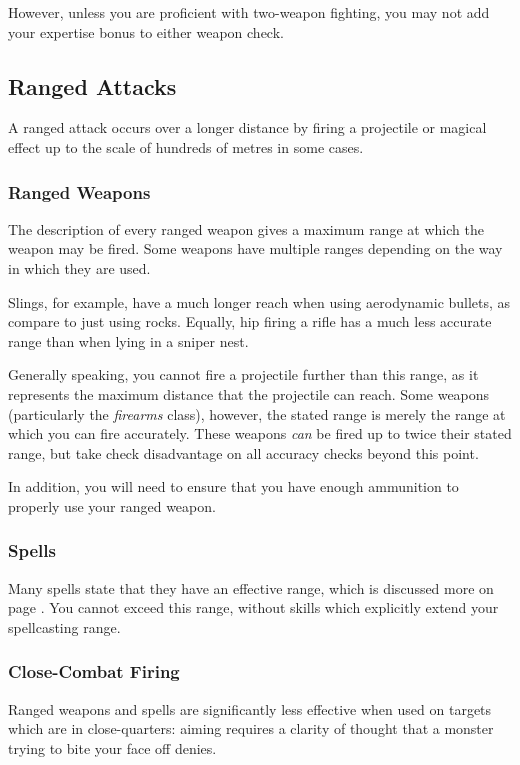 However, unless you are proficient with two-weapon fighting, you may not add your expertise bonus to either weapon check. 

\subsection{Ranged Attacks}

A ranged attack occurs over a longer distance by firing a projectile or magical effect up to the scale of hundreds of metres in some cases. 

\subsubsection{Ranged Weapons}

The description of every ranged weapon gives a maximum range at which the weapon may be fired. Some weapons have multiple ranges depending on the way in which they are used. 

Slings, for example, have a much longer reach when using aerodynamic bullets, as compare to just using rocks. Equally, hip firing a rifle has a much less accurate range than when lying in a sniper nest. 

Generally speaking, you cannot fire a projectile further than this range, as it represents the maximum distance that the projectile can reach. Some weapons (particularly the {\it firearms} class), however, the stated range is merely the range at which you can fire accurately. These weapons {\it can} be fired up to twice their stated range, but take check disadvantage on all accuracy checks beyond this point. 

In addition, you will need to ensure that you have enough ammunition to properly use your ranged weapon.
\subsubsection{Spells}

Many spells state that they have an effective range, which is discussed more on page \pageref{S:Range}. You cannot exceed this range, without skills which explicitly extend your spellcasting range. 

\subsubsection{Close-Combat Firing}

Ranged weapons and spells are significantly less effective when used on targets which are in close-quarters: aiming requires a clarity of thought that a monster trying to bite your face off denies. 

